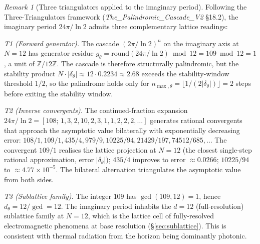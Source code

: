 \documentclass[11pt,a4paper]{article}
\theoremstyle{definition}
\theoremstyle{remark}
\newtheorem{remark}[theorem]{Remark}
\begin{document}
\begin{remark}[Three triangulators applied to the imaginary period]\label{rem:U1-triangulation}
Following the Three-Triangulators framework (\textit{The\_Palindromic\_Cascade\_V2} \S18.2), the imaginary period $24\pi/\ln 2$ admits three complementary lattice readings:

\emph{T1 (Forward generator).} The cascade $(2\pi/\ln 2)^{n}$ on the imaginary axis at $N=12$ has generator residue $g_{\theta} = \mathrm{round}(24\pi/\ln 2) \bmod 12 = 109 \bmod 12 = 1$, a unit of $\mathbb{Z}/12\mathbb{Z}$. The cascade is therefore structurally palindromic, but the stability product $N\cdot |\delta_{\theta}| \approx 12 \cdot 0.2234 \approx 2.68$ exceeds the stability-window threshold $1/2$, so the palindrome holds only for $n_{\max,\theta} = \lfloor 1/(2|\delta_{\theta}|)\rfloor = 2$ steps before exiting the stability window.

\emph{T2 (Inverse convergents).} The continued-fraction expansion $24\pi/\ln 2 = [108;\,1,3,2,10,2,3,1,1,2,2,2,\ldots]$ generates rational convergents that approach the asymptotic value bilaterally with exponentially decreasing error: $108/1, 109/1, 435/4, 979/9, 10225/94, 21429/197, 74512/685,\ldots$ The convergent $109/1$ realises the lattice projection at $N=12$ (the closest single-step rational approximation, error $|\delta_{\theta}|$); $435/4$ improves to error $\approx 0.0266$; $10225/94$ to $\approx 4.77\times 10^{-5}$. The bilateral alternation triangulates the asymptotic value from both sides.

\emph{T3 (Sublattice family).} The integer $109$ has $\gcd(109,12) = 1$, hence $d_{\theta} = 12/\gcd = 12$. The imaginary period inhabits the $d=12$ (full-resolution) sublattice family at $N=12$, which is the lattice cell of fully-resolved electromagnetic phenomena at base resolution (\S\ref{sec:sublattice}). This is consistent with thermal radiation from the horizon being dominantly photonic.
\end{remark}
\end{document}
